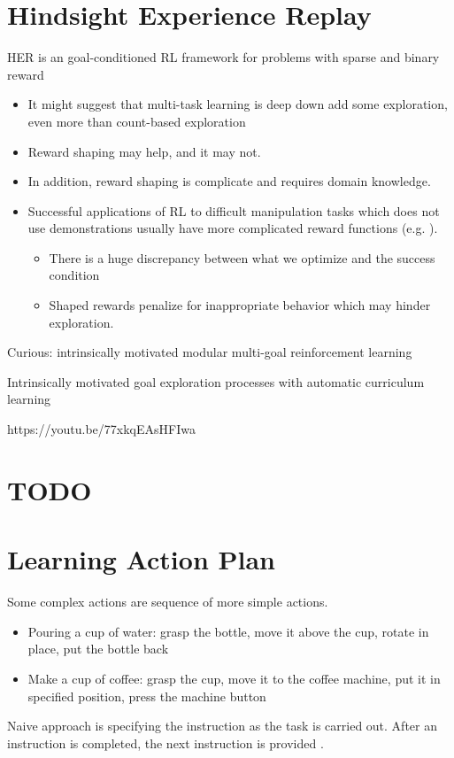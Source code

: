 \section{Hindsight Experience Replay}
\ac{HER} is an goal-conditioned \ac{RL} framework for problems with sparse and binary reward \cite{andrychowicz2017hindsight}
\begin{itemize}
	\item It might suggest that multi-task learning is deep down add some exploration, even more than count-based exploration
	\item Reward shaping may help, and it may not.
	\item In addition, reward shaping is complicate and requires domain knowledge.
	\item \note Successful applications of \ac{RL} to difficult manipulation tasks which does not use
	demonstrations usually have more complicated reward functions (e.g. \cite{popov2017data}).
	\begin{itemize}
		\item There is a huge discrepancy between what we optimize and the success condition
		\item Shaped rewards penalize for inappropriate behavior which may hinder exploration.
	\end{itemize}
\end{itemize}

Curious: intrinsically motivated modular multi-goal reinforcement learning

Intrinsically motivated goal exploration processes with automatic curriculum learning

https://youtu.be/77xkqEAsHFIwa

\section{TODO}
\cite{pathak2018zero}

\section{Learning Action Plan}
Some complex actions are sequence of more simple actions.
\begin{itemize}
	\item Pouring a cup of water: grasp the bottle, move it above the cup, rotate in place, put the bottle back
	\item Make a cup of coffee: grasp the cup, move it to the coffee machine, put it in specified position, press the machine button \cite{smith2019avid}
\end{itemize}
Naive approach is specifying the instruction as the task is carried out. After an instruction is completed, the next instruction is provided \cite{smith2019avid}.

